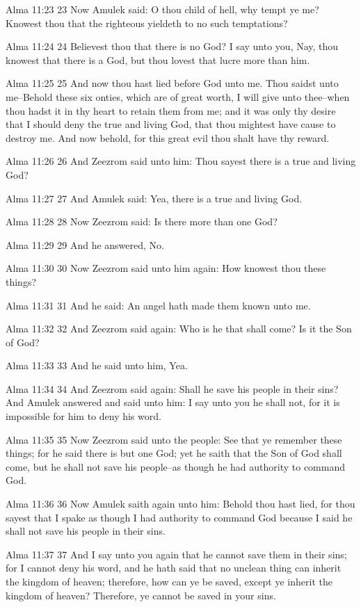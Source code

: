 Alma 11:23
 23 Now Amulek said: O thou child of hell, why tempt ye me?
Knowest thou that the righteous yieldeth to no such temptations?

Alma 11:24
 24 Believest thou that there is no God? I say unto you, Nay,
thou knowest that there is a God, but thou lovest that lucre more
than him.

Alma 11:25
 25 And now thou hast lied before God unto me. Thou saidst unto
me--Behold these six onties, which are of great worth, I will
give unto thee--when thou hadst it in thy heart to retain them
from me; and it was only thy desire that I should deny the true
and living God, that thou mightest have cause to destroy me. And
now behold, for this great evil thou shalt have thy reward.

Alma 11:26
 26 And Zeezrom said unto him: Thou sayest there is a true and
living God?

Alma 11:27
 27 And Amulek said: Yea, there is a true and living God.

Alma 11:28
 28 Now Zeezrom said: Is there more than one God?

Alma 11:29
 29 And he answered, No.

Alma 11:30
 30 Now Zeezrom said unto him again: How knowest thou these
things?

Alma 11:31
 31 And he said: An angel hath made them known unto me.

Alma 11:32
 32 And Zeezrom said again: Who is he that shall come? Is it the
Son of God?

Alma 11:33
 33 And he said unto him, Yea.

Alma 11:34
 34 And Zeezrom said again: Shall he save his people in their
sins? And Amulek answered and said unto him: I say unto you he
shall not, for it is impossible for him to deny his word.

Alma 11:35
 35 Now Zeezrom said unto the people: See that ye remember these
things; for he said there is but one God; yet he saith that the
Son of God shall come, but he shall not save his people--as
though he had authority to command God.

Alma 11:36
 36 Now Amulek saith again unto him: Behold thou hast lied, for
thou sayest that I spake as though I had authority to command God
because I said he shall not save his people in their sins.

Alma 11:37
 37 And I say unto you again that he cannot save them in their
sins; for I cannot deny his word, and he hath said that no
unclean thing can inherit the kingdom of heaven; therefore, how
can ye be saved, except ye inherit the kingdom of heaven?
Therefore, ye cannot be saved in your sins.

